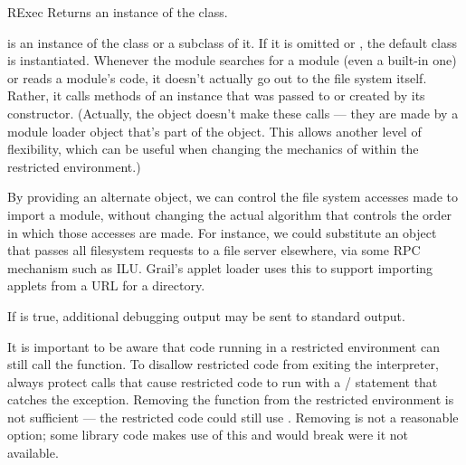 \begin{classdesc}{RExec}{}
Returns an instance of the  class.  

 is an instance of the  class or a subclass of it.
If it is omitted or , the default  class is
instantiated.
Whenever the  module searches for a module (even a
built-in one) or reads a module's code, it doesn't actually go out to
the file system itself.  Rather, it calls methods of an 
instance that was passed to or created by its constructor.  (Actually,
the  object doesn't make these calls --- they are made by
a module loader object that's part of the  object.  This
allows another level of flexibility, which can be useful when changing
the mechanics of  within the restricted environment.)

By providing an alternate  object, we can control the
file system accesses made to import a module, without changing the
actual algorithm that controls the order in which those accesses are
made.  For instance, we could substitute an  object that
passes all filesystem requests to a file server elsewhere, via some
RPC mechanism such as ILU.  Grail's applet loader uses this to support
importing applets from a URL for a directory.

If  is true, additional debugging output may be sent to
standard output.
\end{classdesc}

It is important to be aware that code running in a restricted
environment can still call the  function.  To
disallow restricted code from exiting the interpreter, always protect
calls that cause restricted code to run with a
/ statement that catches the
 exception.  Removing the 
function from the restricted environment is not sufficient --- the
restricted code could still use .  Removing
 is not a reasonable option; some library code
makes use of this and would break were it not available.


\begin{seealso}
\end{seealso}


